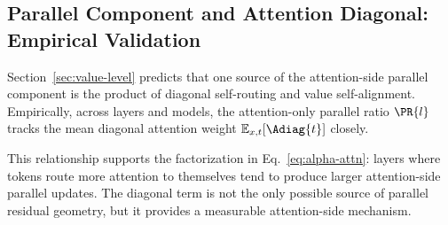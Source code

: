 \subsection{Parallel Component and Attention Diagonal: Empirical Validation}
\label{sec:attn-diagonal-analysis}

Section~\ref{sec:value-level} predicts that one source of the attention-side
parallel component is the product of diagonal self-routing and value
self-alignment. Empirically, across layers and models, the attention-only
parallel ratio $\PR{l}$ tracks the mean diagonal attention weight
$\mathbb{E}_{x,t}[\Adiag{t}]$ closely.

This relationship supports the factorization in
Eq.~\ref{eq:alpha-attn}: layers where tokens route more attention to
themselves tend to produce larger attention-side parallel updates. The
diagonal term is not the only possible source of parallel residual geometry,
but it provides a measurable attention-side mechanism.
